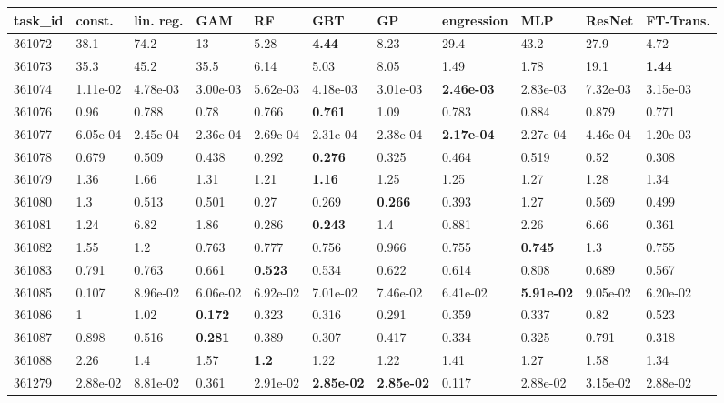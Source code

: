 \begin{table}[ht!]
\centering
\begingroup\footnotesize
\begin{tabular}{lllllllllll}
  \hline
\hline
task\_id & const. & lin. reg. & GAM & RF & GBT & GP & engression & MLP & ResNet & FT-Trans. \\ 
  \hline
361072 & 38.1 & 74.2 & 13 & 5.28 & \textbf{4.44} & 8.23 & 29.4 & 43.2 & 27.9 & 4.72 \\ 
  361073 & 35.3 & 45.2 & 35.5 & 6.14 & 5.03 & 8.05 & 1.49 & 1.78 & 19.1 & \textbf{1.44} \\ 
  361074 & 1.11e-02 & 4.78e-03 & 3.00e-03 & 5.62e-03 & 4.18e-03 & 3.01e-03 & \textbf{2.46e-03} & 2.83e-03 & 7.32e-03 & 3.15e-03 \\ 
  361076 & 0.96 & 0.788 & 0.78 & 0.766 & \textbf{0.761} & 1.09 & 0.783 & 0.884 & 0.879 & 0.771 \\ 
  361077 & 6.05e-04 & 2.45e-04 & 2.36e-04 & 2.69e-04 & 2.31e-04 & 2.38e-04 & \textbf{2.17e-04} & 2.27e-04 & 4.46e-04 & 1.20e-03 \\ 
  361078 & 0.679 & 0.509 & 0.438 & 0.292 & \textbf{0.276} & 0.325 & 0.464 & 0.519 & 0.52 & 0.308 \\ 
  361079 & 1.36 & 1.66 & 1.31 & 1.21 & \textbf{1.16} & 1.25 & 1.25 & 1.27 & 1.28 & 1.34 \\ 
  361080 & 1.3 & 0.513 & 0.501 & 0.27 & 0.269 & \textbf{0.266} & 0.393 & 1.27 & 0.569 & 0.499 \\ 
  361081 & 1.24 & 6.82 & 1.86 & 0.286 & \textbf{0.243} & 1.4 & 0.881 & 2.26 & 6.66 & 0.361 \\ 
  361082 & 1.55 & 1.2 & 0.763 & 0.777 & 0.756 & 0.966 & 0.755 & \textbf{0.745} & 1.3 & 0.755 \\ 
  361083 & 0.791 & 0.763 & 0.661 & \textbf{0.523} & 0.534 & 0.622 & 0.614 & 0.808 & 0.689 & 0.567 \\ 
  361085 & 0.107 & 8.96e-02 & 6.06e-02 & 6.92e-02 & 7.01e-02 & 7.46e-02 & 6.41e-02 & \textbf{5.91e-02} & 9.05e-02 & 6.20e-02 \\ 
  361086 & 1 & 1.02 & \textbf{0.172} & 0.323 & 0.316 & 0.291 & 0.359 & 0.337 & 0.82 & 0.523 \\ 
  361087 & 0.898 & 0.516 & \textbf{0.281} & 0.389 & 0.307 & 0.417 & 0.334 & 0.325 & 0.791 & 0.318 \\ 
  361088 & 2.26 & 1.4 & 1.57 & \textbf{1.2} & 1.22 & 1.22 & 1.41 & 1.27 & 1.58 & 1.34 \\ 
  361279 & 2.88e-02 & 8.81e-02 & 0.361 & 2.91e-02 & \textbf{2.85e-02} & \textbf{2.85e-02} & 0.117 & 2.88e-02 & 3.15e-02 & 2.88e-02 \\ 

\end{tabular}
\end{table}
